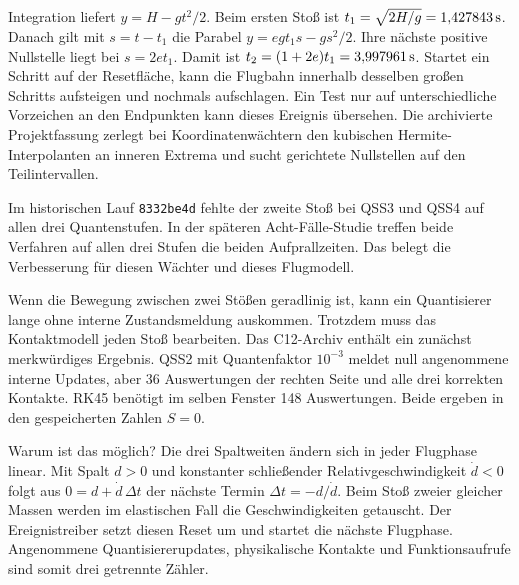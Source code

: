Integration liefert \(y=H-gt^2/2\). Beim ersten Stoß ist \(t_1=\sqrt{2H/g}=1{,}427843\,\mathrm{s}\). Danach gilt mit \(s=t-t_1\) die Parabel \(y=e g t_1s-gs^2/2\). Ihre nächste positive Nullstelle liegt bei \(s=2et_1\). Damit ist \(t_2=(1+2e)t_1=3{,}997961\,\mathrm{s}\).
Startet ein Schritt auf der Resetfläche, kann die Flugbahn innerhalb desselben großen Schritts aufsteigen und nochmals aufschlagen. Ein Test nur auf unterschiedliche Vorzeichen an den Endpunkten kann dieses Ereignis übersehen. Die archivierte Projektfassung zerlegt bei Koordinatenwächtern den kubischen Hermite-Interpolanten an inneren Extrema und sucht gerichtete Nullstellen auf den Teilintervallen.

Im historischen Lauf \texttt{8332be4d} fehlte der zweite Stoß bei QSS3 und QSS4 auf allen drei Quantenstufen. In der späteren Acht-Fälle-Studie treffen beide Verfahren auf allen drei Stufen die beiden Aufprallzeiten. Das belegt die Verbesserung für diesen Wächter und dieses Flugmodell.

Wenn die Bewegung zwischen zwei Stößen geradlinig ist, kann ein Quantisierer lange ohne interne Zustandsmeldung auskommen. Trotzdem muss das Kontaktmodell jeden Stoß bearbeiten. Das C12-Archiv enthält ein zunächst merkwürdiges Ergebnis. QSS2 mit Quantenfaktor \(10^{-3}\) meldet null angenommene interne Updates, aber 36 Auswertungen der rechten Seite und alle drei korrekten Kontakte. RK45 benötigt im selben Fenster 148 Auswertungen. Beide ergeben in den gespeicherten Zahlen \(S=0\).

Warum ist das möglich? Die drei Spaltweiten ändern sich in jeder Flugphase linear. Mit Spalt \(d>0\) und konstanter schließender Relativgeschwindigkeit \(\dot d<0\) folgt aus \(0=d+\dot d\,\Delta t\) der nächste Termin \(\Delta t=-d/\dot d\). Beim Stoß zweier gleicher Massen werden im elastischen Fall die Geschwindigkeiten getauscht. Der Ereignistreiber setzt diesen Reset um und startet die nächste Flugphase. Angenommene Quantisiererupdates, physikalische Kontakte und Funktionsaufrufe sind somit drei getrennte Zähler.

